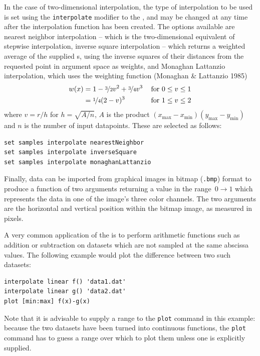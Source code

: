 In the case of two-dimensional interpolation, the type of interpolation to be
used is set using the {\tt interpolate} modifier to the ,
and may be changed at any time after the interpolation function has been
created.  The options available are nearest neighbor interpolation -- which is
the two-dimensional equivalent of stepwise interpolation, inverse square
interpolation -- which returns a weighted average of the supplied \datapoint s,
using the inverse squares of their distances from the requested point in
argument space as weights, and Monaghan Lattanzio interpolation, which uses the
weighting function (Monaghan \& Lattanzio 1985)
\begin{eqnarray*}
w(x) & = 1 - \nicefrac{3}{2}v^2 + \nicefrac{3}{4}v^3 & \,\mathrm{for~}0\leq v\leq 1 \\
     & = \nicefrac{1}{4}(2-v)^3                      & \,\mathrm{for~}1\leq v\leq 2
\end{eqnarray*}
where $v=r/h$ for $h=\sqrt{A/n}$, $A$ is the product
$(x_\mathrm{max}-x_\mathrm{min})(y_\mathrm{max}-y_\mathrm{min})$ and $n$ is the
number of input datapoints. These are selected as follows:

\begin{verbatim}
set samples interpolate nearestNeighbor
set samples interpolate inverseSquare
set samples interpolate monaghanLattanzio
\end{verbatim}

Finally, data can be imported from graphical images in bitmap ({\tt .bmp}) 
format to produce a function of two arguments returning a value in the
range~$0\to1$ which represents the data in one of the image's three color
channels. The two arguments are the horizontal and vertical position within the
bitmap image, as measured in pixels.

A very common application of the  is to perform arithmetic
functions such as addition or subtraction on datasets which are not sampled at
the same abscissa values. The following example would plot the difference
between two such datasets:

\begin{verbatim}
interpolate linear f() 'data1.dat'
interpolate linear g() 'data2.dat'
plot [min:max] f(x)-g(x)
\end{verbatim}

\noindent Note that it is advisable to supply a range to the {\tt plot} command
in this example: because the two datasets have been turned into continuous
functions, the {\tt plot} command has to guess a range over which to plot them
unless one is explicitly supplied.

